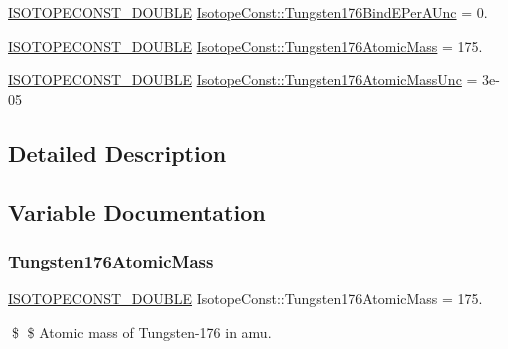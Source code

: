 \begin{DoxyCompactItemize}
\mbox{\hyperlink{group___isotope_const-_macros_ga8f45a7272ce02c0b4c65c44636ed719a}{I\+S\+O\+T\+O\+P\+E\+C\+O\+N\+S\+T\+\_\+\+D\+O\+U\+B\+LE}} \mbox{\hyperlink{group___isotope_const-_tungsten-_w176_ga2a277ec7ed4c2f0e260b77f3d0119e63}{Isotope\+Const\+::\+Tungsten176\+Bind\+E\+Per\+A\+Unc}} = 0.
\item 
\mbox{\hyperlink{group___isotope_const-_macros_ga8f45a7272ce02c0b4c65c44636ed719a}{I\+S\+O\+T\+O\+P\+E\+C\+O\+N\+S\+T\+\_\+\+D\+O\+U\+B\+LE}} \mbox{\hyperlink{group___isotope_const-_tungsten-_w176_ga0862481dfb617594907d96d8eeced019}{Isotope\+Const\+::\+Tungsten176\+Atomic\+Mass}} = 175.
\item 
\mbox{\hyperlink{group___isotope_const-_macros_ga8f45a7272ce02c0b4c65c44636ed719a}{I\+S\+O\+T\+O\+P\+E\+C\+O\+N\+S\+T\+\_\+\+D\+O\+U\+B\+LE}} \mbox{\hyperlink{group___isotope_const-_tungsten-_w176_gaeade9390fb1e3e4a5fedaa3c8c74f573}{Isotope\+Const\+::\+Tungsten176\+Atomic\+Mass\+Unc}} = 3e-\/05
\end{DoxyCompactItemize}


\subsection{Detailed Description}


\subsection{Variable Documentation}
\mbox{\label{group___isotope_const-_tungsten-_w176_ga0862481dfb617594907d96d8eeced019}} 
\subsubsection{\texorpdfstring{Tungsten176\+Atomic\+Mass}{Tungsten176AtomicMass}}
{\footnotesize\ttfamily \mbox{\hyperlink{group___isotope_const-_macros_ga8f45a7272ce02c0b4c65c44636ed719a}{I\+S\+O\+T\+O\+P\+E\+C\+O\+N\+S\+T\+\_\+\+D\+O\+U\+B\+LE}} Isotope\+Const\+::\+Tungsten176\+Atomic\+Mass = 175.}

\$ \$ Atomic mass of Tungsten-\/176 in amu. \mbox{\label{group___isotope_const-_tungsten-_w176_gaeade9390fb1e3e4a5fedaa3c8c74f573}} 
